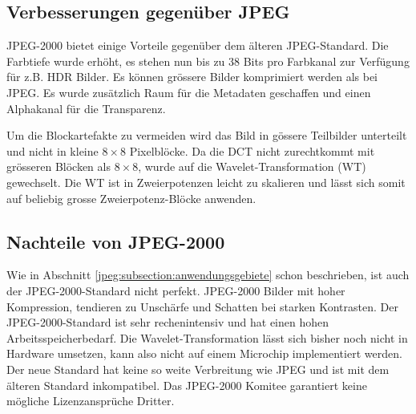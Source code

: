 \subsection{Verbesserungen gegenüber JPEG
\label{jpeg:subsection:verbesserungen}}
JPEG-2000 bietet einige Vorteile gegenüber dem älteren JPEG-Standard.
Die Farbtiefe wurde \mbox{erhöht}, es stehen nun bis zu 38 Bits pro Farbkanal zur Verfügung für z.B. HDR Bilder.
Es können grössere Bilder komprimiert werden als bei JPEG.
Es wurde zusätzlich Raum für die Metadaten geschaffen und einen Alphakanal für die Transparenz.
 
Um die Blockartefakte zu vermeiden wird das Bild in gössere Teilbilder unterteilt und nicht in kleine \(8\times8\) Pixelblöcke.
Da die DCT nicht zurechtkommt mit grösseren Blöcken als \(8\times8\), wurde auf die Wavelet-Transformation (WT) gewechselt.
Die WT ist in Zweierpotenzen leicht zu skalieren und lässt sich somit auf beliebig grosse Zweierpotenz-Blöcke anwenden.

\subsection{Nachteile von JPEG-2000
\label{jpeg:subsection:nachteil}}
Wie in Abschnitt \ref{jpeg:subsection:anwendungsgebiete} schon beschrieben, ist auch der JPEG-2000-Standard nicht perfekt.
JPEG-2000 Bilder mit hoher Kompression, tendieren zu Unschärfe und Schatten bei starken Kontrasten. 
Der JPEG-2000-Standard ist sehr rechenintensiv und hat einen hohen Arbeitsspeicherbedarf. 
Die Wavelet-Transformation lässt sich bisher noch nicht in Hardware umsetzen, kann also nicht auf einem Microchip implementiert werden.
Der neue Standard hat keine so weite Verbreitung wie JPEG und ist mit dem älteren Standard inkompatibel.
Das JPEG-2000 Komitee garantiert keine mögliche Lizenzansprüche Dritter.

